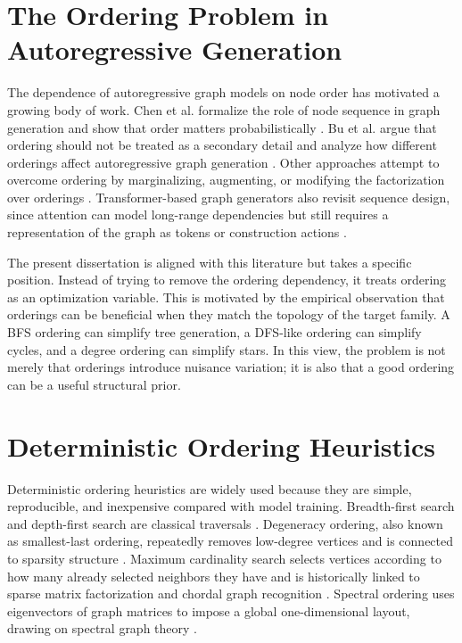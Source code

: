 \section{The Ordering Problem in Autoregressive Generation}
\label{sec:related-ordering-problem}

The dependence of autoregressive graph models on node order has motivated a growing body of work. Chen et al. formalize the role of node sequence in graph generation and show that order matters probabilistically \cite{chen2021ordermatters}. Bu et al. argue that ordering should not be treated as a secondary detail and analyze how different orderings affect autoregressive graph generation \cite{bu2023let}. Other approaches attempt to overcome ordering by marginalizing, augmenting, or modifying the factorization over orderings \cite{cohenkarlik2024olr,wang2025loarm}. Transformer-based graph generators also revisit sequence design, since attention can model long-range dependencies but still requires a representation of the graph as tokens or construction actions \cite{zhao2023graphgpt,chen2025g2pt}.

The present dissertation is aligned with this literature but takes a specific position. Instead of trying to remove the ordering dependency, it treats ordering as an optimization variable. This is motivated by the empirical observation that orderings can be beneficial when they match the topology of the target family. A BFS ordering can simplify tree generation, a DFS-like ordering can simplify cycles, and a degree ordering can simplify stars. In this view, the problem is not merely that orderings introduce nuisance variation; it is also that a good ordering can be a useful structural prior.

\section{Deterministic Ordering Heuristics}
\label{sec:related-heuristics}

Deterministic ordering heuristics are widely used because they are simple, reproducible, and inexpensive compared with model training. Breadth-first search and depth-first search are classical traversals \cite{cormen2009introduction}. Degeneracy ordering, also known as smallest-last ordering, repeatedly removes low-degree vertices and is connected to sparsity structure \cite{matula1983smallestlast}. Maximum cardinality search selects vertices according to how many already selected neighbors they have and is historically linked to sparse matrix factorization and chordal graph recognition \cite{rose1976algorithmic}. Spectral ordering uses eigenvectors of graph matrices to impose a global one-dimensional layout, drawing on spectral graph theory \cite{fiedler1973algebraic}.

